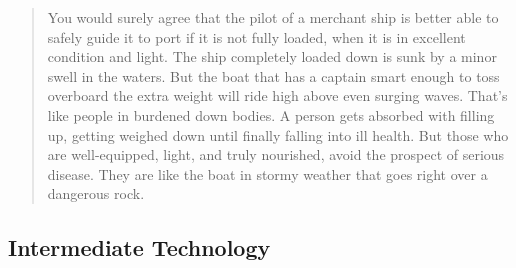 \documentclass[letterpaper]{article}
\begin{document}
\begin{quote}
  You would surely agree that the pilot of a merchant ship is better able to safely guide it to port if it is not fully loaded, when it is in excellent condition and light. The ship completely loaded down is sunk by a minor swell in the waters. But the boat that has a captain smart enough to toss overboard the extra weight will ride high above even surging waves.
  That’s like people in burdened down bodies. A person gets absorbed with filling up, getting weighed down until finally falling into ill health. But those who are well-equipped, light, and truly nourished, avoid the prospect of serious disease. They are like the boat in stormy weather that goes right over a dangerous rock.
\end{quote}

\iffalse
\begin{quote}
  Wine wasn’t in paradise; there was not yet any slaughtering of animals, not yet any eating of meat. After the flood there was wine. After the flood, “you will eat all kinds of things, like you eat vegetables that grow from the ground.” When perfection was despaired, then the enjoyment of those things was allowed.
  Now the wine is an example of inexperience, as Noah was ignorant of the use of wine. For it had not yet come into use in life, neither been known in human custom. Since he had neither seen another do it, nor tried it himself, he was unguardedly hurt by it. “For Noah planted a vineyard, and he drank from the fruit, and he got drunk.” He wasn’t out-of-control drunk, he just wasn’t aware of the potent thing he was consuming.
  \attrib{\textit{On Fasting} 5, St. Basil}
\end{quote}

\begin{quote}
  What did Esau throw away, and so was made a slave of his brother? Didn’t he sell his rights as first-born for a single meal? By contrast, wasn’t it with fasting and prayer that Hannah was favored to become the mother of Samuel?
  \attrib{\textit{On Fasting} 6, St. Basil}
\end{quote}
\fi

\subsection{Intermediate Technology}
\hfill

\hfill

\hfill

\hfill

\hfill

\hfill

\hfill
\end{document}
